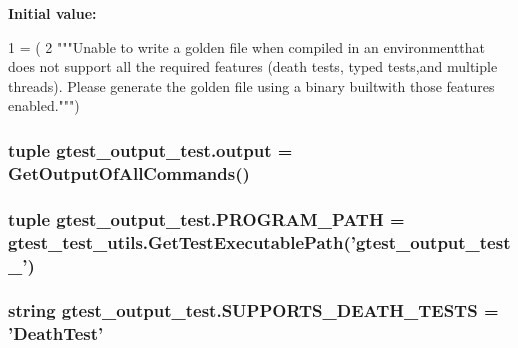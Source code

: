 {\bfseries Initial value\-:}
\begin{DoxyCode}
1 = (
2           \textcolor{stringliteral}{"""Unable to write a golden file when compiled in an environmentthat does not support all the
       required features (death tests, typed tests,and multiple threads).  Please generate the golden file using a
       binary builtwith those features enabled."""})
\end{DoxyCode}
\hypertarget{namespacegtest__output__test_a7d428bb6e16eda248484d1428715858b}{
\subsubsection[{output}]{\setlength{\rightskip}{0pt plus 5cm}tuple gtest\-\_\-output\-\_\-test.\-output = {\bf Get\-Output\-Of\-All\-Commands}()}}\label{namespacegtest__output__test_a7d428bb6e16eda248484d1428715858b}
\hypertarget{namespacegtest__output__test_a091d7c2220b9da215ddfa38130aaa49a}{
\subsubsection[{P\-R\-O\-G\-R\-A\-M\-\_\-\-P\-A\-T\-H}]{\setlength{\rightskip}{0pt plus 5cm}tuple gtest\-\_\-output\-\_\-test.\-P\-R\-O\-G\-R\-A\-M\-\_\-\-P\-A\-T\-H = {\bf gtest\-\_\-test\-\_\-utils.\-Get\-Test\-Executable\-Path}('gtest\-\_\-output\-\_\-test\-\_\-')}}\label{namespacegtest__output__test_a091d7c2220b9da215ddfa38130aaa49a}
\hypertarget{namespacegtest__output__test_a401e837dae10d6c728bd74684884a77f}{
\subsubsection[{S\-U\-P\-P\-O\-R\-T\-S\-\_\-\-D\-E\-A\-T\-H\-\_\-\-T\-E\-S\-T\-S}]{\setlength{\rightskip}{0pt plus 5cm}string gtest\-\_\-output\-\_\-test.\-S\-U\-P\-P\-O\-R\-T\-S\-\_\-\-D\-E\-A\-T\-H\-\_\-\-T\-E\-S\-T\-S = 'Death\-Test'}}\label{namespacegtest__output__test_a401e837dae10d6c728bd74684884a77f}
